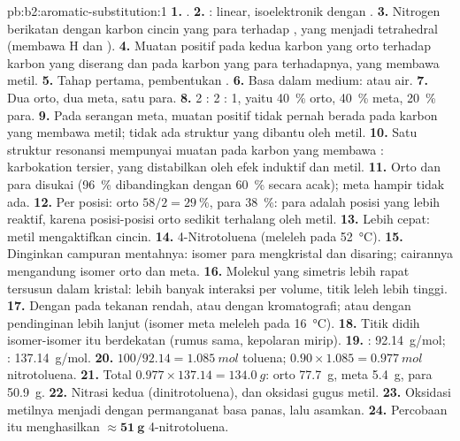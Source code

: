 \begin{solution}{pb:b2:aromatic-substitution:1}
\textbf{1.} .
\textbf{2.} : linear, isoelektronik dengan .
\textbf{3.} Nitrogen berikatan dengan karbon cincin yang para terhadap
, yang menjadi tetrahedral (membawa H dan ).
\textbf{4.} Muatan positif pada kedua karbon yang orto terhadap karbon yang
diserang dan pada karbon yang para terhadapnya, yang membawa metil.
\textbf{5.} Tahap pertama, pembentukan .
\textbf{6.} Basa dalam medium:  atau air.
\textbf{7.} Dua orto, dua meta, satu para.
\textbf{8.} 2 : 2 : 1, yaitu 40~\% orto, 40~\% meta, 20~\% para.
\textbf{9.} Pada serangan meta, muatan positif tidak pernah berada pada
karbon yang membawa metil; tidak ada struktur yang dibantu oleh metil.
\textbf{10.} Satu struktur resonansi mempunyai muatan pada karbon yang
membawa : karbokation tersier, yang distabilkan oleh efek induktif
dan  metil.
\textbf{11.} Orto dan para disukai (96~\% dibandingkan dengan 60~\% secara
acak); meta hampir tidak ada.
\textbf{12.} Per posisi: orto $58/2 = 29~\%$, para 38~\%: para adalah posisi yang lebih reaktif,
karena posisi-posisi orto sedikit terhalang oleh metil.
\textbf{13.} Lebih cepat: metil mengaktifkan cincin.
\textbf{14.} 4-Nitrotoluena (meleleh pada \qty{52}{\degreeCelsius}).
\textbf{15.} Dinginkan campuran mentahnya: isomer para mengkristal dan
disaring; cairannya mengandung isomer orto dan meta.
\textbf{16.} Molekul yang simetris lebih rapat tersusun dalam kristal: lebih
banyak interaksi per volume, titik leleh lebih tinggi.
\textbf{17.} Dengan  pada tekanan rendah, atau dengan
kromatografi; atau dengan pendinginan lebih lanjut (isomer meta meleleh pada
\qty{16}{\degreeCelsius}).
\textbf{18.} Titik didih isomer-isomer itu berdekatan (rumus sama,
kepolaran mirip).
\textbf{19.} : \qty{92.14}{g/mol}; : \qty{137.14}{g/mol}.
\textbf{20.} $100/92.14 = \qty{1.085}{mol}$ toluena; $0.90 \times 1.085 = \qty{0.977}{mol}$
nitrotoluena.
\textbf{21.} Total $0.977 \times 137.14 = \qty{134.0}{g}$: orto \qty{77.7}{g}, meta
\qty{5.4}{g}, para \qty{50.9}{g}.
\textbf{22.} Nitrasi kedua (dinitrotoluena), dan oksidasi gugus metil.
\textbf{23.} Oksidasi metilnya menjadi  dengan permanganat basa
panas, lalu asamkan.
\textbf{24.} Percobaan itu menghasilkan $\boldsymbol{\approx \qty{51}{g}}$ 4-nitrotoluena.
\end{solution}
